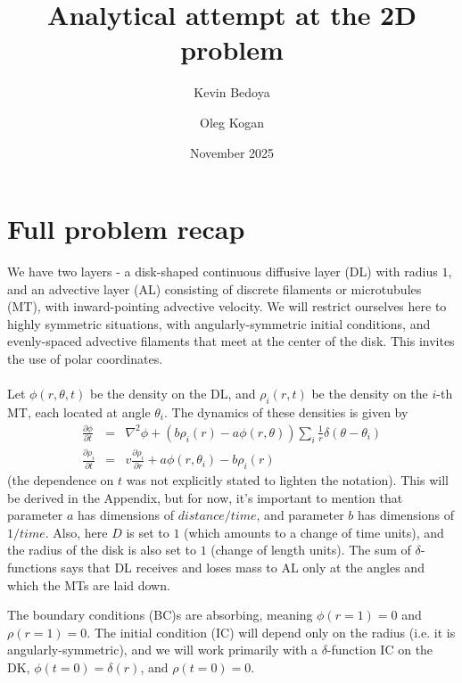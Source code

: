 \documentclass{article}
\title{Analytical attempt at the 2D problem}
\author{Kevin Bedoya \and Oleg Kogan}
\date{November 2025}
\begin{document}
\maketitle

\section{Full problem recap}
We have two layers - a disk-shaped continuous diffusive layer (DL) with radius $1$, and an advective layer (AL) consisting of discrete filaments or microtubules (MT), with inward-pointing advective velocity.  We will restrict ourselves here to highly symmetric situations, with angularly-symmetric initial conditions, and evenly-spaced advective filaments that meet at the center of the disk.  This invites the use of polar coordinates.
\\
\\
Let $\phi(r,\theta,t)$ be the density on the DL, and $\rho_i(r,t)$ be the density on the $i$-th MT, each located at angle $\theta_i$.  The dynamics of these densities is given by
\begin{eqnarray}
\label{Eq:one} \frac{\partial \phi}{\partial t} &=& \nabla^2 \phi +\left(b \rho_i(r) - a \phi(r,\theta)\right)\sum_{i}\frac{1}{r}\delta(\theta - \theta_i) \\
\label{eq:two} \frac{\partial \rho_i}{\partial t} &=& v \frac{\partial \rho_i}{\partial r} + a\phi(r,\theta_i) - b \rho_i(r)
\end{eqnarray}
(the dependence on $t$ was not explicitly stated to lighten the notation).  This will be derived in the Appendix, but for now, it's important to mention that parameter $a$ has dimensions of $distance/time$, and parameter $b$ has dimensions of $1/time$.  Also, here $D$ is set to $1$ (which amounts to a change of time units), and the radius of the disk is also set to $1$ (change of length units).  The sum of $\delta$-functions says that DL receives and loses mass to AL only at the angles and which the MTs are laid down.  

The boundary conditions (BC)s are absorbing, meaning $\phi(r=1) = 0$ and $\rho(r=1) = 0$.  The initial condition (IC) will depend only on the radius (i.e. it is angularly-symmetric), and we will work primarily with a $\delta$-function IC on the DK, $\phi(t=0) = \delta(r)$, and $\rho(t=0) = 0$.
\end{document}
